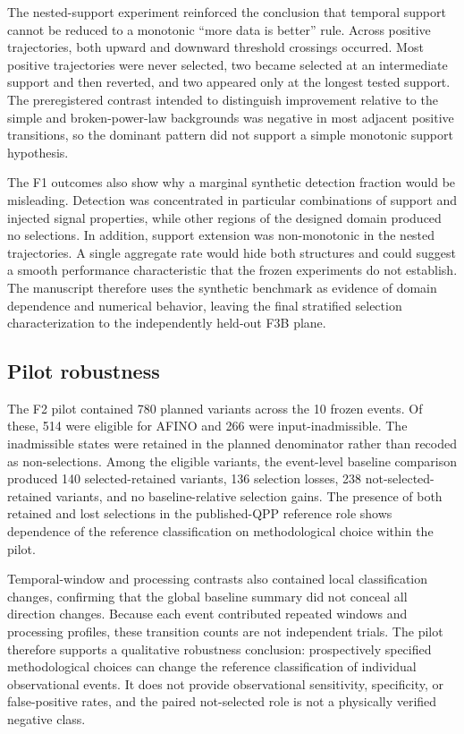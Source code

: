 \documentclass[11pt,a4paper]{article}
\begin{document}
The nested-support experiment reinforced the conclusion that temporal support cannot be reduced to a monotonic ``more data is better'' rule. Across positive trajectories, both upward and downward threshold crossings occurred. Most positive trajectories were never selected, two became selected at an intermediate support and then reverted, and two appeared only at the longest tested support. The preregistered contrast intended to distinguish improvement relative to the simple and broken-power-law backgrounds was negative in most adjacent positive transitions, so the dominant pattern did not support a simple monotonic support hypothesis.

The F1 outcomes also show why a marginal synthetic detection fraction would be misleading. Detection was concentrated in particular combinations of support and injected signal properties, while other regions of the designed domain produced no selections. In addition, support extension was non-monotonic in the nested trajectories. A single aggregate rate would hide both structures and could suggest a smooth performance characteristic that the frozen experiments do not establish. The manuscript therefore uses the synthetic benchmark as evidence of domain dependence and numerical behavior, leaving the final stratified selection characterization to the independently held-out F3B plane.

\subsection{Pilot robustness}
The F2 pilot contained 780 planned variants across the 10 frozen events. Of these, 514 were eligible for AFINO and 266 were input-inadmissible. The inadmissible states were retained in the planned denominator rather than recoded as non-selections. Among the eligible variants, the event-level baseline comparison produced 140 selected-retained variants, 136 selection losses, 238 not-selected-retained variants, and no baseline-relative selection gains. The presence of both retained and lost selections in the published-QPP reference role shows dependence of the reference classification on methodological choice within the pilot.

Temporal-window and processing contrasts also contained local classification changes, confirming that the global baseline summary did not conceal all direction changes. Because each event contributed repeated windows and processing profiles, these transition counts are not independent trials. The pilot therefore supports a qualitative robustness conclusion: prospectively specified methodological choices can change the reference classification of individual observational events. It does not provide observational sensitivity, specificity, or false-positive rates, and the paired not-selected role is not a physically verified negative class.
\end{document}

